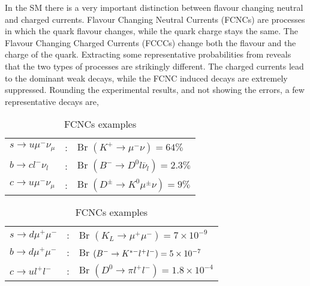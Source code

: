 In the SM there is a very important distinction between flavour changing neutral and charged currents. Flavour Changing Neutral Currents (FCNCs) are processes in which the quark flavour changes, while the quark charge stays the same. 
%
The Flavour Changing Charged Currents (FCCCs) change both the flavour and the charge of the quark. 
%
Extracting some representative probabilities from \cite{Tanabashi2018} reveals that the two types of processes are strikingly different.  
%
The charged currents lead to the dominant weak decays, while the FCNC induced decays are extremely suppressed. Rounding the experimental results, and not showing the errors, a few representative decays are, 
%
\setlength{\tabcolsep}{2pt} %
\renewcommand{\arraystretch}{1} %
%
\begin{table}[!htb]
    \begin{minipage}{.5\linewidth}
      \caption{FCCCs examples}
\centering
\begin{tabular}{lcl}
$s \rightarrow u \mu^- \nu_\mu $ & : & Br $\left( K^+ \rightarrow \mu^- \nu\right) = 64 \%$                 \\
$b \rightarrow c l^- \nu_l $       & : & Br $\left( B^- \rightarrow D^0 l \overline{\nu}_l \right) = 2.3 \% $ \\
$c \rightarrow u \mu^- \nu_\mu $   & : & Br $\left( D^\pm \rightarrow K^0 \mu^\pm \nu \right) = 9 \%$        
\end{tabular}
    \end{minipage}%
    \begin{minipage}{.5\linewidth}
      \centering
        \caption{FCNCs examples}
\begin{tabular}{lcl}
$s \rightarrow d \mu^+ \mu^- $ & : & Br $\left( K_L \rightarrow\mu^+ \mu^- \right) =  7\times10^{-9}$        \\
$ b \rightarrow d \mu^+ \mu^-$ & : & Br $\left( B^- \rightarrow  K^{\** -} l^+ l^- \right) =  5\times10^{-7}$ \\
$ c \rightarrow u l^+ l^-$     & : & Br $\left( D^0 \rightarrow \pi l^+ l^- \right) =  1.8\times10^{-4}$      
\end{tabular}
    \end{minipage} 
\end{table}

\setlength{\tabcolsep}{6pt} %
\renewcommand{\arraystretch}{1} %

